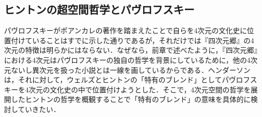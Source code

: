 \begin{comment}
Nous pouvons découper des volumes au moyen de surfaces. Nous pouvons découper des surfaces au moyen de lignes, nous pouvons déterminer des lignes au moyen de points. Mais, lorsqu'il s'agit pour nous de définir le point, notre science euclidienne fait défaut et s'évanouit. Lorsqu'il nous faut rendre compte du continu physique, notre impuissance est extrême. Nous comprenons bien que la science n'est autre chose qu'un langage conventionnel qui nous permet de cataloguer et de classifier certaines fractions de phénomènes que nous détachons artificiellement l'une de l'autre, d'après leurs qualités, mais nous sentons bien que cette science, de même que le langage, est incapable de traduire cette continuité qui appartient au monde des qualités et que l'on ne saurait définir par des chiffres.
4次元小説の代表例
ただし，これはEncyclopédie de l'utopie des voyages extraordinaires et de la science fictionのDimensionの項目に依拠している．

1844, Edwin. A. Abbott, Flatland, une aventure à plusieurs dimensions
1886, C. H. Hinton, A Plane World, Scientific Romances
1893, Ambrose Bierce, Charles Ashmore’s Trail, Can such things be?
1895, H. G. Wells, Un étrange phénomène
1896, H. G. Wells, L’histoire de Plattner
1921, Austin Hall, The Blind Spot
1922, Gabriel de Lautrec, Dan le monde voisin…, La vengeance du portrait ovale
1923, Claude Farrere, LA-BAS, Où?
1925, Jean Ray, Les étranges études du docteur Paukenschlager, Contes du whisky
1932, Homer Eon Flint, The Spot of life
1944, Léon Groc, La planète de cristal
1944, René Barjavel, Le Voyageur imprudent
1957, David Ducan, La raiser d’Occam
1969, Harlen Ellison, A Boy and his Dog
\end{comment}
\subsection{ヒントンの超空間哲学とパヴロフスキー}

パヴロフスキーがポアンカレの著作を踏まえたことで自らを4次元の文化史に位置付けていることはすでに示した通りであるが，それだけでは『四次元郷』の4次元の特徴は明らかにはならない．なぜなら，前章で述べたように，『四次元郷』における4次元はパヴロフスキーの独自の哲学を背景にしているために，他の4次元ないし異次元を扱った小説とは一線を画しているからである．ヘンダーソンは，それに対して，ウェルズとヒントンの「特有のブレンド」としてパヴロフスキーを4次元の文化史の中で位置付けようとした．そこで，4次元空間の哲学を展開したヒントンの哲学を概観することで「特有のブレンド」の意味を具体的に検討していきたい．

